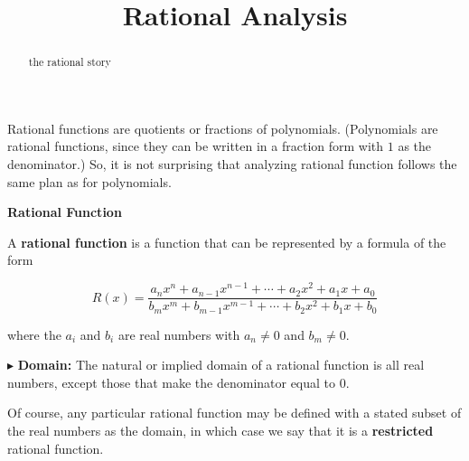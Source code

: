 \documentclass{ximera}
\title{Rational Analysis}
\begin{document}
\begin{abstract}
the rational story
\end{abstract}
\maketitle









Rational functions are quotients or fractions of polynomials.  (Polynomials are rational functions, since they can be written in a fraction form with $1$ as the denominator.)  So, it is not surprising that analyzing rational function follows the same plan as for polynomials.



















\begin{idea} \item \textbf{\textcolor{green!50!black}{Rational Function}}  


A \textbf{rational function} is a function that can be represented by a formula of the form


\[   R(x) = \frac{a_n x^n + a_{n-1} x^{n-1} + \cdots + a_2 x^2 + a_1 x + a_0}{b_m x^m + b_{m-1} x^{m-1} + \cdots + b_2 x^2 + b_1 x + b_0}        \]

where the $a_i$ and $b_i$ are real numbers with $a_n \ne 0$ and $b_m \ne 0$.


\end{idea}



$\blacktriangleright$ \textbf{\textcolor{red!10!blue!90!}{Domain:}}  The natural or implied domain of a rational function is all real numbers, except those that make the denominator equal to $0$.  



Of course, any particular rational function may be defined with a stated subset of the real numbers as the domain, in which case we  say that it is a \textbf{restricted} rational function.
\end{document}
